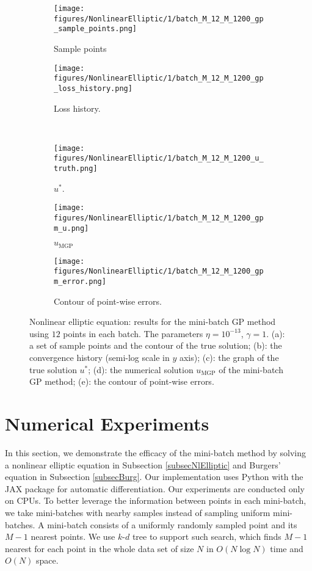 \documentclass[10pt,reqno]{amsart}
\newcommand{\1}{{\chi}}
\numberwithin{equation}{section}
\theoremstyle{thmlemcorr}
\numberwithin{theorem}{section}
\theoremstyle{thmlemcorr*}
\theoremstyle{defi}
\theoremstyle{remexample}
\theoremstyle{ass}
\begin{document}
\begin{figure}[!hbtbp]
	\centering          
	\begin{subfigure}[b]{0.3\textwidth}
		\texttt{[image: figures/NonlinearElliptic/1/batch\_M\_12\_M\_1200\_gp\_sample\_points.png]}
		\caption{Sample points}
		\label{fig:NonlinearElliptic:sp}
	\end{subfigure} 
	\begin{subfigure}[b]{0.3\textwidth}
		\texttt{[image: figures/NonlinearElliptic/1/batch\_M\_12\_M\_1200\_gp\_loss\_history.png]}
		\caption{Loss history.}
		\label{fig:NonlinearElliptic:lshst1}
	\end{subfigure} \\
	\begin{subfigure}[b]{0.3\textwidth}
		\texttt{[image: figures/NonlinearElliptic/1/batch\_M\_12\_M\_1200\_u\_truth.png]}
		\caption{$u^*$.}
		\label{fig:NonlinearElliptic:ustar}
	\end{subfigure} 
	\begin{subfigure}[b]{0.3\textwidth}
		\texttt{[image: figures/NonlinearElliptic/1/batch\_M\_12\_M\_1200\_gpm\_u.png]}
		\caption{$u_{\text{MGP}}$}
		\label{fig:NonlinearElliptic:gpmu}
	\end{subfigure} 
	\begin{subfigure}[b]{0.3\textwidth}
		\texttt{[image: figures/NonlinearElliptic/1/batch\_M\_12\_M\_1200\_gpm\_error.png]}
		\caption{Contour of point-wise errors.}
		\label{fig:NonlinearElliptic:error1}
	\end{subfigure} 
	\caption{Nonlinear elliptic equation: results for the mini-batch GP method using $12$ points in each batch. The parameters $\eta=10^{-13}$, $\gamma=1$. (a): a set of sample points and the contour of the true solution; (b): the convergence history (semi-log scale in $y$ axis); (c): the graph of the true solution $u^*$; (d): the numerical solution $u_{\text{MGP}}$ of the mini-batch GP method; (e): the contour of point-wise errors. }
	\label{fig:NonlinearElliptic:1}
\end{figure}

\section{Numerical Experiments}
\label{secNumResults}
In this section, we demonstrate the efficacy of the mini-batch method by solving a nonlinear elliptic equation in Subsection \ref{subsecNlElliptic} and Burgers' equation in Subsection \ref{subsecBurg}. Our implementation uses Python with the JAX package for automatic differentiation. Our experiments are conducted only on CPUs. To better leverage the information between points in each mini-batch, we take mini-batches with nearby samples instead of sampling uniform mini-batches. A mini-batch consists of a uniformly randomly sampled point and its $M-1$ nearest points. We use $k$-$d$ tree to support such search, which finds $M-1$ nearest for each point in the whole data set of size $N$ in $O(N\log N)$ time and $O(N)$ space. 
\end{document}

